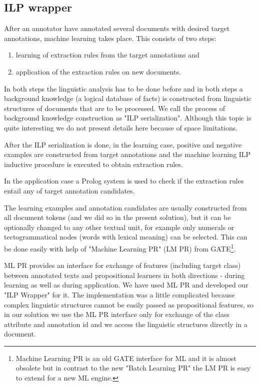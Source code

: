 \documentclass[runningheads,a4paper]{llncs}
\begin{document}
\subsection{ILP wrapper}
After an annotator have annotated several documents with desired target annotations, machine learning takes place. 
This consists of two steps: 
\begin{enumerate}
	\item learning of extraction rules from the target annotations and
	\item application of the extraction rules on new documents.
\end{enumerate}
In both steps the linguistic analysis has to be done before and in both steps a background knowledge (a logical database of facts) is constructed from linguistic structures of documents that are to be processed. We call the process of background knowledge construction as "ILP serialization". Although this topic is quite interesting we do not present details here because of space limitations.

After the ILP serialization is done, in the learning case, positive and negative examples are constructed from target annotations and the machine learning ILP inductive procedure is executed to obtain extraction rules.

In the application case a Prolog system is used to check if the extraction rules entail any of target annotation candidates.

The learning examples and annotation candidates are usually constructed from all document tokens (and we did so in the present solution), but it can be optionally changed to any other textual unit, for example only numerals or tectogrammatical nodes (words with lexical meaning) can be selected. This can be done easily with help of "Machine Learning PR" (LM PR) from GATE\footnote{Machine Learning PR is an old GATE interface for ML and it is almost obsolete but in contrast to the new "Batch Learning PR" the LM PR is easy to extend for a new ML engine.}.

ML PR provides an interface for exchange of features (including target class) between annotated texts and propositional learners in both directions - during learning as well as during application. We have used ML PR and developed our "ILP Wrapper" for it. The implementation was a little complicated because complex linguistic structures cannot be easily passed as propositional features, so in our solution we use the ML PR interface only for exchange of the class attribute and annotation id and we access the linguistic structures directly in a document.
\end{document}
